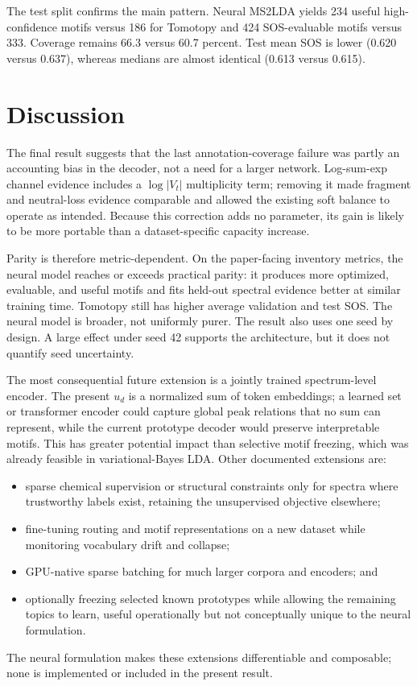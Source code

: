 \documentclass[10pt,a4paper]{article}
\begin{document}
The test split confirms the main pattern. Neural MS2LDA yields 234 useful
high-confidence motifs versus 186 for Tomotopy and 424 SOS-evaluable motifs
versus 333. Coverage remains 66.3 versus 60.7 percent. Test mean SOS is lower
(0.620 versus 0.637), whereas medians are almost identical (0.613 versus
0.615).

\section{Discussion}

The final result suggests that the last annotation-coverage failure was partly
an accounting bias in the decoder, not a need for a larger network. Log-sum-exp
channel evidence includes a $\log|V_t|$ multiplicity term; removing it made
fragment and neutral-loss evidence comparable and allowed the existing soft
balance to operate as intended. Because this correction adds no parameter, its
gain is likely to be more portable than a dataset-specific capacity increase.

Parity is therefore metric-dependent. On the paper-facing inventory metrics,
the neural model reaches or exceeds practical parity: it produces more
optimized, evaluable, and useful motifs and fits held-out spectral evidence
better at similar training time. Tomotopy still has higher average validation
and test SOS. The neural model is broader, not uniformly purer. The result also
uses one seed by design. A large effect under seed 42 supports the architecture,
but it does not quantify seed uncertainty.

The most consequential future extension is a jointly trained spectrum-level
encoder. The present $u_d$ is a normalized sum of token embeddings; a learned
set or transformer encoder could capture global peak relations that no sum can
represent, while the current prototype decoder would preserve interpretable
motifs. This has greater potential impact than selective motif freezing, which
was already feasible in variational-Bayes LDA. Other documented extensions are:
\begin{itemize}
  \item sparse chemical supervision or structural constraints only for spectra
  where trustworthy labels exist, retaining the unsupervised objective
  elsewhere;
  \item fine-tuning routing and motif representations on a new dataset while
  monitoring vocabulary drift and collapse;
  \item GPU-native sparse batching for much larger corpora and encoders; and
  \item optionally freezing selected known prototypes while allowing the
  remaining topics to learn, useful operationally but not conceptually unique
  to the neural formulation.
\end{itemize}
The neural formulation makes these extensions differentiable and composable;
none is implemented or included in the present result.
\end{document}
